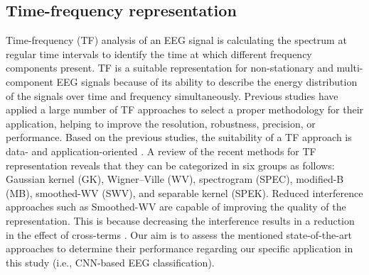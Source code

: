 \documentclass{article}
\begin{document}
\subsection{Time-frequency representation}\label{tfd}
\vspace{-1mm}
Time-frequency (TF) analysis of an EEG signal is calculating the spectrum at regular time intervals to identify 
the time at which different frequency components present. 
TF is a suitable representation for non-stationary and multi-component EEG signals because of its ability to describe the energy distribution of the signals over time and frequency simultaneously.  
Previous studies have applied a large number of TF approaches to select a proper methodology for their application, helping to improve the resolution, robustness, precision, or performance. Based on the previous studies, the suitability of a TF approach is data- and application-oriented \cite{Victor}. A review of the recent methods for TF representation reveals that they can be categorized in six groups as follows: Gaussian kernel (GK), Wigner--Ville (WV), spectrogram (SPEC), modified-B (MB), smoothed-WV (SWV), and separable kernel (SPEK).
Reduced interference approaches such as Smoothed-WV are capable of improving the quality of the representation. This is because decreasing the interference results in a reduction in the effect of cross-terms \cite{ava}. Our aim is to assess the mentioned state-of-the-art approaches to determine their performance regarding our specific application in this study (i.e., CNN-based EEG classification).
\begin{comment}
\begin{table}
  \caption{TFs and their related kernels.  $\gamma$ is a real positive value and $W[l]$ shows the basic function for a window. $Hann_l[l]$ and $Hamm_m[l]$ are Hanning and Hamming functions, respectively.} 
  \label{sam}
  \centering
  \begin{tabular}{lll}
\textbf{TF} 	     & \textbf{Kernel}     & \textbf{Kernel Type}     \\\hline
    SEPK	     &$Hamm_n[l]Hann_l[l]$	     & Separable kernel       \\
    SWV	     & $\delta[l]W[n]$     & Lag-independent  Kernel     \\  
    GK	         & $\frac{\surd{\pi\sigma}}{2|m|} e^{\frac{-\pi^2\sigma l^2}{4n^2}}$    & Product kernel      \\
	MB	         &    $\frac{cosh^{-2\gamma}} {\sum_{l}^{}{cosh^{-2\gamma }l}}$  & Lag-independent  \\    
    SPEC	     & $W[l+n]W[l-n]$     & Non-separable kernel         \\
    WV		     & $\delta[l]$  & Lag-independent Kernel     \\\hline
  \end{tabular}
\end{table}
\end{comment}
\vspace{-8pt}
\end{document}

